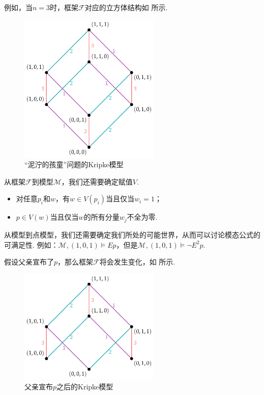 例如，当$n=3$时，框架$\mathcal{F}$对应的立方体结构如 所示. 

\begin{figure}[ht]
    \centering
    \includegraphics[width=0.6\textwidth]{figures/modal-logic/cubic-example.pdf}
    \caption{“泥泞的孩童”问题的Kripke模型}\label{fig:modal-logic-cubic}
\end{figure}

从框架$\mathcal{F}$到模型$\mathcal{M}$，我们还需要确定赋值$V$. 
\begin{itemize}
    \item 对任意$p_i$和$w$，有$w\in V(p_i)$当且仅当$w_i=1$；
    \item $p\in V(w)$当且仅当$w$的所有分量$w_j$不全为零. 
\end{itemize}

从模型到点模型，我们还需要确定我们所处的可能世界，从而可以讨论模态公式的可满足性. 例如：$\mathcal{M},(1,0,1)\vDash Ep$，但是$\mathcal{M},(1,0,1)\vDash \neg E^2p$. 

假设父亲宣布了$p$，那么框架$\mathcal{F}$将会发生变化，如 所示. 

\begin{figure}[h]
    \centering
    \includegraphics[width=0.6\textwidth]{figures/modal-logic/cubic-example-after-father.pdf}
    \caption{父亲宣布$p$之后的Kripke模型}\label{fig:modal-logic-cubic-after-father}
\end{figure}

